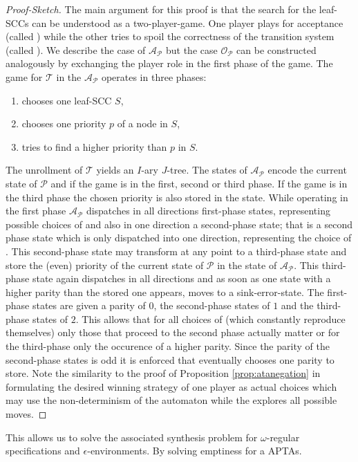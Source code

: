 \begin{proof}[Proof-Sketch]
  The main argument for this proof is that the search for the leaf-\acp{SCC} 
  can be understood as a two-player-game. One player plays for acceptance 
  (called \acceptor{}) while the other tries to spoil the correctness of the 
  transition system (called \spoiler{}). We describe the case of 
  $\mathcal{A}_{\mathcal{P}}$ but the case $\mathcal{O}_{\mathcal{P}}$ can be 
  constructed analogously by exchanging the player role in the first phase of 
  the game. The game for $\mathcal{T}$ in the $\mathcal{A}_{\mathcal{P}}$ 
  operates in three phases:
  \begin{enumerate}
    \item \spoiler{} chooses one leaf-\ac{SCC} $S$,
    \item \acceptor{} chooses one priority $p$ of a node in $S$,
    \item \spoiler{} tries to find a higher priority than $p$ in $S$.
  \end{enumerate}
  The unrollment of $\mathcal{T}$ yields an $I$-ary $J$-tree. The states of 
  $\mathcal{A}_{\mathcal{P}}$ encode the current state of $\mathcal{P}$ and if
  the game is in the first, second or third phase. If the game is in the third
  phase the chosen priority is also stored in the state. While operating in the
  first phase $\mathcal{A}_{\mathcal{P}}$ dispatches in all directions 
  first-phase states, representing possible choices of \spoiler{} and also in
  one direction a second-phase state; that is a second phase state which is 
  only dispatched into one direction, representing the choice of
  \acceptor{}. This second-phase state may transform at any point to a 
  third-phase state and store the (even) priority of the current 
  state of $\mathcal{P}$ in the state of $\mathcal{A}_{\mathcal{P}}$. This 
  third-phase state again dispatches in all directions and as soon as one state 
  with a higher parity than the stored one appears, moves to a 
  sink-error-state. The first-phase states are given a parity of $0$, the 
  second-phase states of $1$ and the third-phase states of $2$. This allows 
  that for all choices of \spoiler{} (which constantly reproduce themselves) 
  only those that proceed to the second phase actually matter or for the 
  third-phase only the occurence of a higher parity. Since the parity of the 
  second-phase states is odd it is enforced that \acceptor{} eventually chooses 
  one parity to store. Note the similarity to the proof of Proposition
  \ref{prop:atanegation} in formulating the desired winning strategy of one 
  player as actual choices which may use the non-determinism of the automaton 
  while the \spoiler{} explores all possible moves. 
\end{proof}
This allows us to solve the associated synthesis problem for $\omega$-regular
specifications and $\epsilon$-environments. By solving emptiness for a 
\acp{APTA}.

